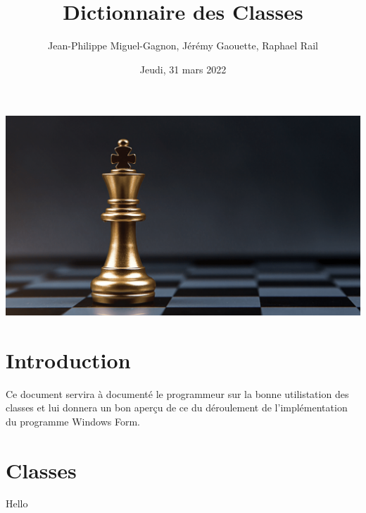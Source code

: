 \documentclass[12pt, letterpaper, twoside]{article}
\title{Dictionnaire des Classes}
\author{Jean-Philippe Miguel-Gagnon, Jérémy Gaouette, Raphael Rail}
\date{Jeudi, 31 mars 2022}
\begin{document}
\begin{titlepage}
\maketitle
\includegraphics[width=\textwidth]{CHESS}
\end{titlepage}

\tableofcontents

\newpage

\section{Introduction}

Ce document servira à documenté le programmeur sur la bonne utilistation
des classes et lui donnera un bon aperçu de ce du déroulement de l'implémentation 
du programme Windows Form.

\section{Classes}

Hello
\end{document}
